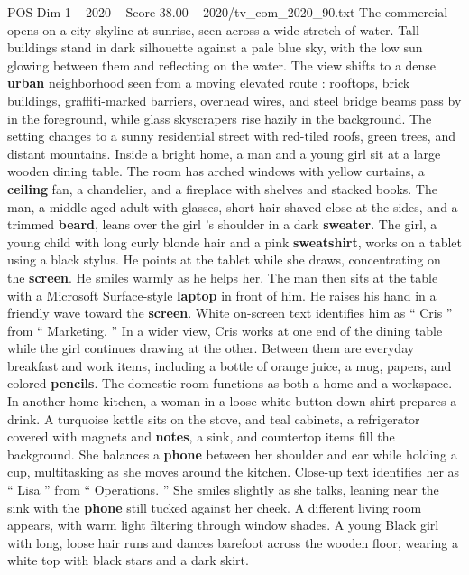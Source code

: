 \begin{textsample}{POS Dim 1 – 2020 – Score 38.00 – 2020/tv\_com\_2020\_90.txt}  \label{ex:f1_pos_001}
The commercial opens on a city skyline at sunrise, seen across a wide stretch of water.
Tall buildings stand in dark silhouette against a pale blue sky, with the low sun glowing between them and reflecting on the water.
The view shifts to a dense \textbf{urban} neighborhood seen from a moving elevated route : rooftops, brick buildings, graffiti-marked barriers, overhead wires, and steel bridge beams pass by in the foreground, while glass skyscrapers rise hazily in the background.
The setting changes to a sunny residential street with red-tiled roofs, green trees, and distant mountains.
Inside a bright home, a man and a young girl sit at a large wooden dining table.
The room has arched windows with yellow curtains, a \textbf{ceiling} fan, a chandelier, and a fireplace with shelves and stacked books.
The man, a middle-aged adult with glasses, short hair shaved close at the sides, and a trimmed \textbf{beard}, leans over the girl ’s shoulder in a dark \textbf{sweater}.
The girl, a young child with long curly blonde hair and a pink \textbf{sweatshirt}, works on a tablet using a black stylus.
He points at the tablet while she draws, concentrating on the \textbf{screen}.
He smiles warmly as he helps her.
The man then sits at the table with a Microsoft Surface-style \textbf{laptop} in front of him.
He raises his hand in a friendly wave toward the \textbf{screen}.
White on-screen text identifies him as “ Cris ” from “ Marketing. ” In a wider view, Cris works at one end of the dining table while the girl continues drawing at the other.
Between them are everyday breakfast and work items, including a bottle of orange juice, a mug, papers, and colored \textbf{pencils}.
The domestic room functions as both a home and a workspace.
In another home kitchen, a woman in a loose white button-down shirt prepares a drink.
A turquoise kettle sits on the stove, and teal cabinets, a refrigerator covered with magnets and \textbf{notes}, a sink, and countertop items fill the background.
She balances a \textbf{phone} between her shoulder and ear while holding a cup, multitasking as she moves around the kitchen.
Close-up text identifies her as “ Lisa ” from “ Operations. ” She smiles slightly as she talks, leaning near the sink with the \textbf{phone} still tucked against her cheek.
A different living room appears, with warm light filtering through window shades.
A young Black girl with long, loose hair runs and dances barefoot across the wooden floor, wearing a white top with black stars and a dark skirt.

\end{textsample}
